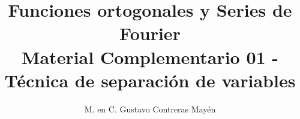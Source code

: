 
\usepackage{titling}
\setlength{\droptitle}{-3cm}
\title{Funciones ortogonales y Series de Fourier \\[0.3em]  \large{Material Complementario 01 - Técnica de separación de variables} \vspace{-3ex}}
\author{M. en C. Gustavo Contreras Mayén}
\date{ }




\vspace{-2in}
\maketitle
\fontsize{14}{14}\selectfont
\tableofcontents
\newpage

